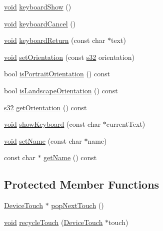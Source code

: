 \begin{DoxyCompactItemize}
\item 
\mbox{\hyperlink{_thread_8h_af1e856da2e658414cb2456cb6f7ebc66}{void}} \mbox{\hyperlink{classnjli_1_1_world_input_ab184e4e367239a869380a20df466317b}{keyboard\+Show}} ()
\item 
\mbox{\hyperlink{_thread_8h_af1e856da2e658414cb2456cb6f7ebc66}{void}} \mbox{\hyperlink{classnjli_1_1_world_input_aebf5ac94a3d6c07fb30cad466c01a8c0}{keyboard\+Cancel}} ()
\item 
\mbox{\hyperlink{_thread_8h_af1e856da2e658414cb2456cb6f7ebc66}{void}} \mbox{\hyperlink{classnjli_1_1_world_input_a6eaa672bdd98abede6e8caa2faa0e61c}{keyboard\+Return}} (const char $\ast$text)
\item 
\mbox{\hyperlink{_thread_8h_af1e856da2e658414cb2456cb6f7ebc66}{void}} \mbox{\hyperlink{classnjli_1_1_world_input_a453864260fa99d407de3453e3bea109b}{set\+Orientation}} (const \mbox{\hyperlink{_util_8h_aa62c75d314a0d1f37f79c4b73b2292e2}{s32}} orientation)
\item 
bool \mbox{\hyperlink{classnjli_1_1_world_input_a07a0e30b12ae436d0cfecdedfedac7de}{is\+Portrait\+Orientation}} () const
\item 
bool \mbox{\hyperlink{classnjli_1_1_world_input_a779e7f72cc5681b9500a1fbd8004109b}{is\+Landscape\+Orientation}} () const
\item 
\mbox{\hyperlink{_util_8h_aa62c75d314a0d1f37f79c4b73b2292e2}{s32}} \mbox{\hyperlink{classnjli_1_1_world_input_a416f740cf8583f2d03a682a2ddce46b4}{get\+Orientation}} () const
\item 
\mbox{\hyperlink{_thread_8h_af1e856da2e658414cb2456cb6f7ebc66}{void}} \mbox{\hyperlink{classnjli_1_1_world_input_a903fab91e0b94cb0be9444b3095d0b28}{show\+Keyboard}} (const char $\ast$current\+Text)
\item 
\mbox{\hyperlink{_thread_8h_af1e856da2e658414cb2456cb6f7ebc66}{void}} \mbox{\hyperlink{classnjli_1_1_world_input_a087eb5f8d9f51cc476f12f1d10a3cb95}{set\+Name}} (const char $\ast$name)
\item 
const char $\ast$ \mbox{\hyperlink{classnjli_1_1_world_input_ad41266885be835f3ee602311e20877a4}{get\+Name}} () const
\end{DoxyCompactItemize}
\subsection*{Protected Member Functions}
\begin{DoxyCompactItemize}
\item 
\mbox{\hyperlink{classnjli_1_1_device_touch}{Device\+Touch}} $\ast$ \mbox{\hyperlink{classnjli_1_1_world_input_aa8e794dd446367b3130469c0a79a5e1d}{pop\+Next\+Touch}} ()
\item 
\mbox{\hyperlink{_thread_8h_af1e856da2e658414cb2456cb6f7ebc66}{void}} \mbox{\hyperlink{classnjli_1_1_world_input_ad60c4859e00c667566906dbaeefd99b0}{recycle\+Touch}} (\mbox{\hyperlink{classnjli_1_1_device_touch}{Device\+Touch}} $\ast$touch)
\end{DoxyCompactItemize}
